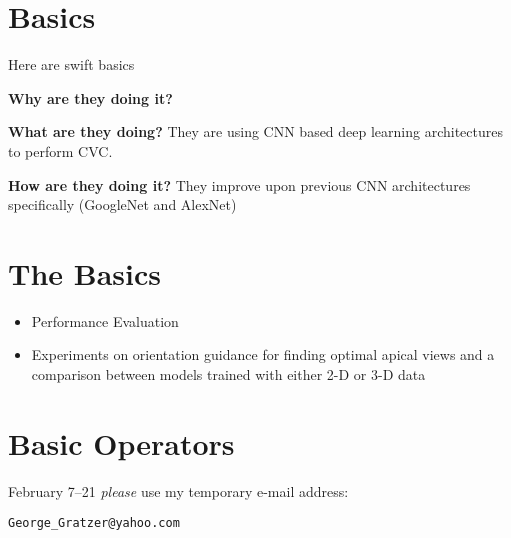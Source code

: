 \section*{Basics}
Here are swift basics

\textbf{Why are they doing it?}

\textbf{What are they doing?}
They are using CNN based deep learning architectures to perform CVC.

\textbf{How are they doing it?}
They improve upon previous CNN architectures specifically (GoogleNet and AlexNet)

\section*{The Basics}
  \begin{itemize}
    \item Performance Evaluation
    \item Experiments on orientation guidance for finding optimal apical views 
    and a comparison between models trained with either 2-D or 3-D data
  \end{itemize}

\section*{Basic Operators}

  February 7--21 \emph{please} use my
  temporary e-mail address:
  \begin{center}
  \texttt{George\_Gratzer@yahoo.com}
    \end{center}